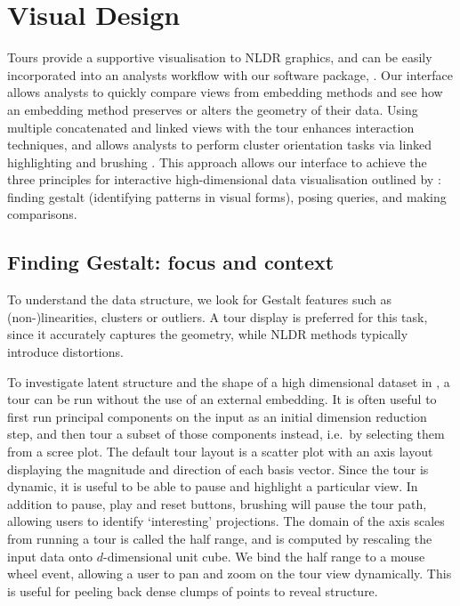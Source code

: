 \documentclass[article,notitle]{jdssv}
\begin{document}
\hypertarget{visual-design}{%
\section{Visual Design}\label{visual-design}}

Tours provide a supportive visualisation to NLDR graphics, and
can be easily incorporated into an analysts workflow with our software package,
. Our interface allows analysts to quickly compare
views from embedding methods and see how an embedding method
preserves or alters the geometry of their data. Using multiple concatenated and
linked views with the tour enhances interaction techniques, and allows
analysts to perform cluster orientation tasks via linked highlighting and
brushing \citep{McDonald1982-ew, Becker1987-gd}.
This approach allows our interface to achieve
the three principles for interactive high-dimensional data visualisation outlined
by \citet{Buja1996-fk}: finding gestalt (identifying patterns in visual forms), posing queries, and making comparisons.

\hypertarget{finding-gestalt-focus-and-context}{%
\subsection{Finding Gestalt: focus and context}\label{finding-gestalt-focus-and-context}}

To understand the data structure, we look for Gestalt features such as
(non-)linearities, clusters or outliers. A tour display is
preferred for this task, since it accurately captures the geometry, while NLDR
methods typically introduce distortions.

To investigate latent structure and the shape of a high dimensional dataset in
, a tour can be run without the use of an external embedding.
It is often useful to
first run principal components on the input as an initial dimension reduction
step, and then tour a subset of those components instead, i.e.~by selecting
them from a scree plot. The default tour layout is a scatter plot with an axis
layout displaying the magnitude and direction of each basis vector. Since the
tour is dynamic, it is useful to be able to pause and highlight a
particular view. In addition to pause, play and reset buttons, brushing will
pause the tour path, allowing users to identify `interesting' projections.
The
domain of the axis scales from running a tour is called the half range, and is
computed by rescaling the input data onto \(d\)-dimensional unit cube. We bind
the half range to a mouse wheel event, allowing a user to pan and zoom on the
tour view dynamically. This is useful for peeling back dense clumps of points
to reveal structure.
\end{document}
